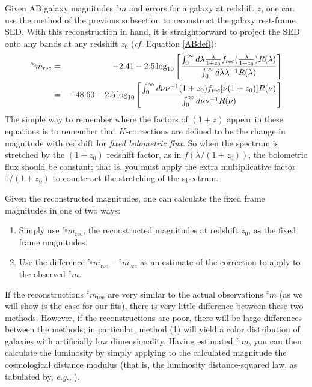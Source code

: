 \documentclass[10pt,preprint]{aastex}
\newcommand{\band}[2]{\ensuremath{^{#1}\!{#2}}}
\begin{document}
Given AB galaxy magnitudes $\band{z}{m}$ and errors for a galaxy at
redshift $z$, one can use the method of the previous subsection to
reconstruct the galaxy rest-frame SED.  With this reconstruction in
hand, it is straightforward to project the SED onto any bands at any
redshift $z_0$ ({\it cf.} Equation \ref{ABdef}):
\begin{eqnarray}
\band{z_0}{m_{\mathrm{rec}}} &=& -2.41 - 2.5 \log_{10}\left[
\frac{\int_{0}^{\infty} d\lambda \frac{\lambda}{1+z_0}
f_{\mathrm{rec}}(\frac{\lambda}{1+z_0}) R(\lambda)} {\int_{0}^{\infty}
d\lambda \lambda^{-1} R(\lambda)}\right] \cr &=& -48.60 - 2.5
\log_{10}\left[ \frac{\int_{0}^{\infty} d\nu \nu^{-1} (1+z_0)
f_{\mathrm{rec}}[\nu (1+z_0)] R(\nu)} {\int_{0}^{\infty} d\nu \nu^{-1}
R(\nu)}\right]
\end{eqnarray}
The simple way to remember where the factors of $(1+z)$ appear in
these equations is to remember that $K$-corrections are defined to be
the change in magnitude with redshift for {\it fixed bolometric flux}.
So when the spectrum is stretched by the $(1+z_0)$ redshift factor, as
in $f(\lambda/(1+z_0))$, the bolometric flux should be constant; that
is, you must apply the extra multiplicative factor $1/(1+z_0)$ to
counteract the stretching of the spectrum.

Given the reconstructed magnitudes, one can calculate the fixed frame
magnitudes in one of two ways:
\begin{enumerate}
\item Simply use $\band{z_0}{m_{\mathrm{rec}}}$, the reconstructed
magnitudes at redshift $z_0$, as the fixed frame magnitudes.
\item Use the difference
$\band{z_0}{m_{\mathrm{rec}}}-\band{z}{m_{\mathrm{rec}}}$ as an
estimate of the correction to apply to the observed $\band{z}{m}$.
\end{enumerate}
If the reconstructions $\band{z}{m_{\mathrm{rec}}}$ are very similar
to the actual observations $\band{z}{m}$ (as we will show is the case
for our fits), there is very little difference between these two
methods. However, if the reconstructions are poor, there will be large
differences between the methods; in particular, method (1) will yield
a color distribution of galaxies with artificially low
dimensionality. Having estimated $\band{z_0}{m}$, you can then
calculate the luminosity by simply applying to the calculated
magnitude the cosmological distance modulus (that is, the luminosity
distance-squared law, as tabulated by, {\it e.g.},  \citealt{hogg99a}).
\end{document}
